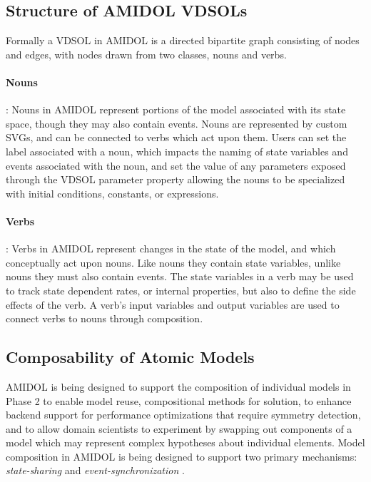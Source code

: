 \documentclass[11pt]{article}
\newcommand{\amidol}{\textsc{AMIDOL}}
\begin{document}
\subsection{Structure of \amidol{} VDSOLs}

Formally a VDSOL in \amidol{} is a directed bipartite graph consisting of nodes and edges, with nodes drawn from two classes, nouns and verbs.

\paragraph{Nouns}: Nouns in \amidol{} represent portions of the model associated with its state space, though they may also contain events.  Nouns are represented by custom SVGs, and can be connected to verbs which act upon them.  Users can set the label associated with a noun, which impacts the naming of state variables and events associated with the noun, and set the value of any parameters exposed through the VDSOL parameter property allowing the nouns to be specialized with initial conditions, constants, or expressions.

\paragraph{Verbs}: Verbs in \amidol{} represent changes in the state of the model, and which conceptually act upon nouns.  Like nouns they contain state variables, unlike nouns they must also contain events.  The state variables in a verb may be used to track state dependent rates, or internal properties, but also to define the side effects of the verb.  A verb's input variables and output variables are used to connect verbs to nouns through composition.

\subsection{Composability of Atomic Models}

\amidol{} is being designed to support the composition of individual models in Phase 2 to enable model reuse, compositional methods for solution, to enhance backend support for performance optimizations that require symmetry detection, and to allow domain scientists to experiment by swapping out components of a model which may represent complex hypotheses about individual elements.  Model composition in \amidol{} is being designed to support two primary mechanisms: \emph{state-sharing} \cite{sanders1992dependability,sanders1988construction} and \emph{event-synchronization} \cite{lampka2002symbolic}.
\end{document}
